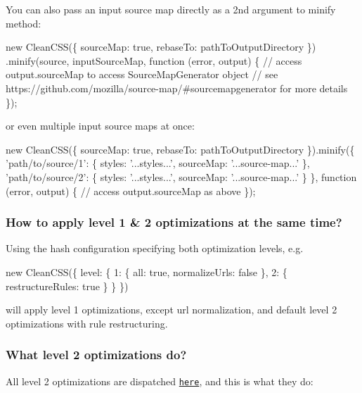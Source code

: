 You can also pass an input source map directly as a 2nd argument to {\ttfamily minify} method\+:


\begin{DoxyCode}
new CleanCSS(\{ sourceMap: true, rebaseTo: pathToOutputDirectory \})
  .minify(source, inputSourceMap, function (error, output) \{
    // access output.sourceMap to access SourceMapGenerator object
    // see https://github.com/mozilla/source-map/#sourcemapgenerator for more details
\});
\end{DoxyCode}


or even multiple input source maps at once\+:


\begin{DoxyCode}
new CleanCSS(\{ sourceMap: true, rebaseTo: pathToOutputDirectory \}).minify(\{
  'path/to/source/1': \{
    styles: '...styles...',
    sourceMap: '...source-map...'
  \},
  'path/to/source/2': \{
    styles: '...styles...',
    sourceMap: '...source-map...'
  \}
\}, function (error, output) \{
  // access output.sourceMap as above
\});
\end{DoxyCode}


\subsubsection*{How to apply level 1 \& 2 optimizations at the same time?}

Using the hash configuration specifying both optimization levels, e.\+g.


\begin{DoxyCode}
new CleanCSS(\{
  level: \{
    1: \{
      all: true,
      normalizeUrls: false
    \},
    2: \{
      restructureRules: true
    \}
  \}
\})
\end{DoxyCode}


will apply level 1 optimizations, except url normalization, and default level 2 optimizations with rule restructuring.

\subsubsection*{What level 2 optimizations do?}

All level 2 optimizations are dispatched \href{https://github.com/jakubpawlowicz/clean-css/blob/master/lib/optimizer/level-2/optimize.js#L67}{\tt here}, and this is what they do\+:


